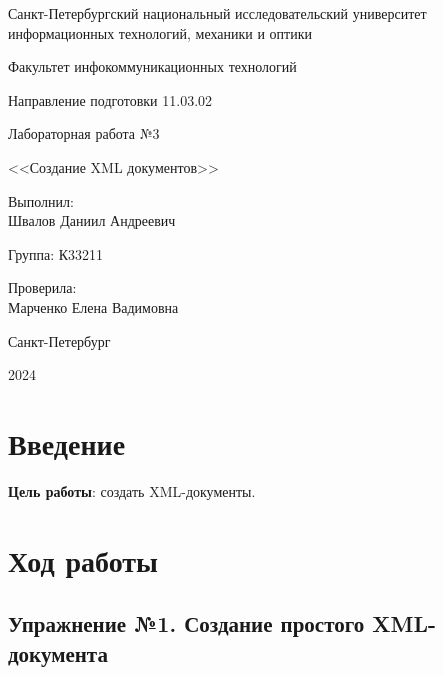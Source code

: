 \documentclass[a4paper, 14pt]{extarticle}
\begin{document}
\begin{titlepage}
  \vspace{0pt plus2fill}
  \noindent

  \vspace{0pt plus6fill}
  \begin{center}
    Санкт-Петербургский национальный исследовательский университет
    информационных технологий, механики и оптики

    \vspace{0pt plus3fill}

    Факультет инфокоммуникационных технологий

    Направление подготовки 11.03.02

    \vspace{0pt plus2fill}

    Лабораторная работа №3

    <<Создание XML документов>>

  \end{center}

  \vspace{0pt plus6fill}
  \begin{flushright}
    Выполнил: \\
    Швалов Даниил Андреевич

    Группа: К33211

    Проверила: \\
    Марченко Елена Вадимовна
  \end{flushright}

  \vspace{0pt plus5fill}
  \begin{center}
    Санкт-Петербург

    2024
  \end{center}
\end{titlepage}

\section{Введение}

\textbf{Цель работы}: создать XML-документы.

\section{Ход работы}

\subsection*{Упражнение №1. Создание простого XML-документа}
\end{document}
